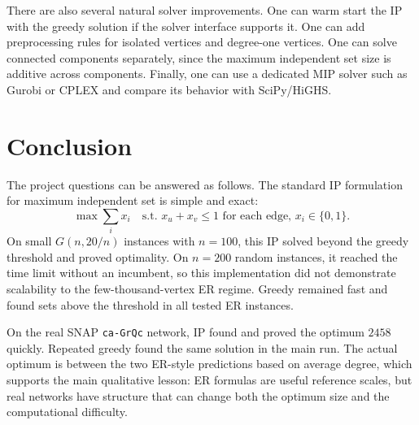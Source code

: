 \documentclass[11pt]{article}
\begin{document}
There are also several natural solver improvements. One can warm start the IP
with the greedy solution if the solver interface supports it. One can add
preprocessing rules for isolated vertices and degree-one vertices. One can solve
connected components separately, since the maximum independent set size is
additive across components. Finally, one can use a dedicated MIP solver such as
Gurobi or CPLEX and compare its behavior with SciPy/HiGHS.

\section{Conclusion}

The project questions can be answered as follows. The standard IP formulation
for maximum independent set is simple and exact:
\[
  \max \sum_i x_i \quad \text{s.t. } x_u+x_v \leq 1 \text{ for each edge, }
  x_i \in \{0,1\}.
\]
On small $G(n,20/n)$ instances with $n=100$, this IP solved beyond the greedy
threshold and proved optimality. On $n=200$ random instances, it reached the
time limit without an incumbent, so this implementation did not demonstrate
scalability to the few-thousand-vertex ER regime. Greedy remained fast and found
sets above the threshold in all tested ER instances.

On the real SNAP \texttt{ca-GrQc} network, IP found and proved the optimum
$2458$ quickly. Repeated greedy found the same solution in the main run. The
actual optimum is between the two ER-style predictions based on average degree,
which supports the main qualitative lesson: ER formulas are useful reference
scales, but real networks have structure that can change both the optimum size
and the computational difficulty.
\end{document}
